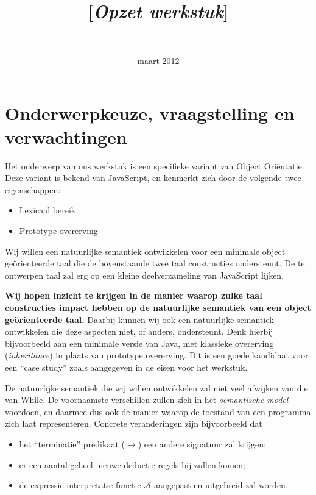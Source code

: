 \documentclass[a4paper,11pt]{article}
\title{\Title \\ {\Large [\textit{Opzet werkstuk}]}}
\author{\Kelley \\ \Tim}
\date{maart 2012}
\begin{document}
\maketitle
\thispagestyle{fancy}

\section*{Onderwerpkeuze, vraagstelling en verwachtingen}

Het onderwerp van ons werkstuk is een specifieke variant van Object Oriëntatie. Deze variant is bekend van JavaScript, en kenmerkt zich door de volgende twee eigenschappen:

\begin{itemize}
	\item Lexicaal bereik
	\item Prototype overerving
\end{itemize}

Wij willen een natuurlijke semantiek ontwikkelen voor een minimale object geörienteerde taal die de bovenstaande twee taal constructies ondersteunt. De te ontwerpen taal zal erg op een kleine deelverzameling van JavaScript lijken.

\textbf{Wij hopen inzicht te krijgen in de manier waarop zulke taal constructies impact hebben op de natuurlijke semantiek van een object geörienteerde taal.} Daarbij kunnen wij ook een natuurlijke semantiek ontwikkelen die deze aspecten niet, of anders, ondersteunt. Denk hierbij bijvoorbeeld aan een minimale versie van Java, met klassieke overerving (\emph{inheritance}) in plaats van prototype overerving. Dit is een goede kandidaat voor een ``case study'' zoals aangegeven in de eisen voor het werkstuk.

De natuurlijke semantiek die wij willen ontwikkelen zal niet veel afwijken van die van While. De voornaamste verschillen zullen zich in het \emph{semantische model} voordoen, en daarmee dus ook de manier waarop de toestand van een programma zich laat representeren. Concrete veranderingen zijn bijvoorbeeld dat

\begin{itemize}
	\item het ``terminatie'' predikaat ($\longrightarrow$) een andere signatuur zal krijgen;
	\item er een aantal geheel nieuwe deductie regels bij zullen komen;
	\item de expressie interpretatie functie $\mathcal{A}$ aangepast en uitgebreid zal worden.
\end{itemize}
\end{document}
